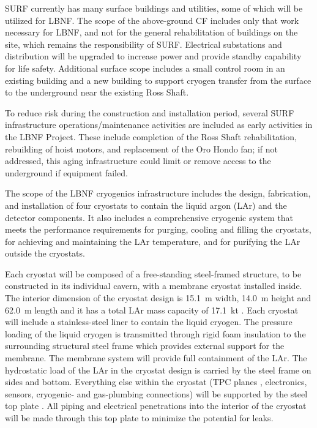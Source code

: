SURF currently has many surface buildings and utilities, some of which will be utilized for LBNF. The scope of the above-ground CF includes only that work necessary for LBNF, and not for the general rehabilitation of buildings on the site, which remains the responsibility of SURF. %
Electrical substations and distribution will be upgraded to increase power and provide standby capability for life safety. Additional surface scope includes a small control room in an existing building and a new building to support cryogen transfer from the surface to the underground near the existing Ross Shaft.

To reduce risk during the construction and installation period, several SURF infrastructure operations/maintenance activities are included as early activities in  the LBNF Project. These include completion of the Ross Shaft rehabilitation, rebuilding of hoist motors, and replacement of the Oro Hondo fan; if not addressed, this aging infrastructure could limit or remove access to the underground if equipment failed. 

The scope of the LBNF cryogenics infrastructure includes the design, fabrication, and installation of four cryostats to contain the liquid argon (LAr) and the detector components. It also includes a comprehensive cryogenic system that meets the performance requirements for purging, cooling and filling the cryostats, for achieving and maintaining the LAr temperature, and for purifying the LAr outside the cryostats. 

Each cryostat will be composed of a free-standing steel-framed structure, to be constructed in %
its individual cavern, with a membrane cryostat %
installed inside. The interior dimension of the cryostat design is 15.1~m width, 14.0~m height and 62.0~m length and it has  a total LAr mass capacity of 17.1~kt . Each %
cryostat will include a stainless-steel liner to contain the liquid cryogen. The pressure loading of the liquid cryogen is transmitted through rigid foam insulation to the surrounding structural steel frame which provides external support for the membrane. The membrane system will provide full containment of the LAr. The hydrostatic load of the LAr in the cryostat design is carried by the steel frame on sides and bottom. Everything else within the cryostat (TPC planes , electronics, sensors, cryogenic- and gas-plumbing connections) will be supported by the steel top plate . All piping and electrical penetrations into the interior of the cryostat will be made through this top plate to minimize the potential for leaks.

